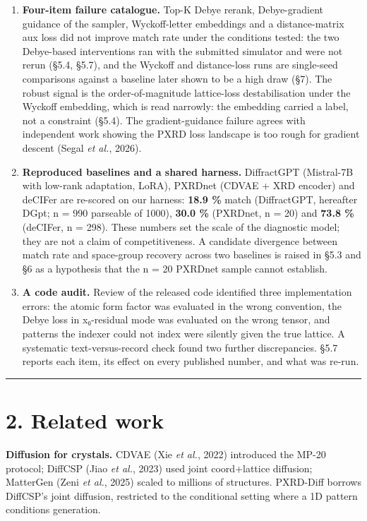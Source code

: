 \documentclass[
  11pt,
]{article}
\begin{document}
\begin{enumerate}
  downstream (§3.5).
\item
  \textbf{Four-item failure catalogue.} Top-K Debye rerank,
  Debye-gradient guidance of the sampler, Wyckoff-letter embeddings and
  a distance-matrix aux loss did not improve match rate under the
  conditions tested: the two Debye-based interventions ran with the
  submitted simulator and were not rerun (§5.4, §5.7), and the Wyckoff
  and distance-loss runs are single-seed comparisons against a baseline
  later shown to be a high draw (§7). The robust signal is the
  order-of-magnitude lattice-loss destabilisation under the Wyckoff
  embedding, which is read narrowly: the embedding carried a label, not
  a constraint (§5.4). The gradient-guidance failure agrees with
  independent work showing the PXRD loss landscape is too rough for
  gradient descent (Segal \emph{et al.}, 2026).
\item
  \textbf{Reproduced baselines and a shared harness.} DiffractGPT
  (Mistral-7B with low-rank adaptation, LoRA), PXRDnet (CDVAE + XRD
  encoder) and deCIFer are re-scored on our harness: \textbf{18.9 \%}
  match (DiffractGPT, hereafter DGpt; n = 990 parseable of 1000),
  \textbf{30.0 \%} (PXRDnet, n = 20) and \textbf{73.8 \%} (deCIFer, n =
  298). These numbers set the scale of the diagnostic model; they are
  not a claim of competitiveness. A candidate divergence between match
  rate and space-group recovery across two baselines is raised in §5.3
  and §6 as a hypothesis that the n = 20 PXRDnet sample cannot
  establish.
\item
  \textbf{A code audit.} Review of the released code identified three
  implementation errors: the atomic form factor was evaluated in the
  wrong convention, the Debye loss in x₀-residual mode was evaluated on
  the wrong tensor, and patterns the indexer could not index were
  silently given the true lattice. A systematic text-versus-record check
  found two further discrepancies. §5.7 reports each item, its effect on
  every published number, and what was re-run.
\end{enumerate}

\begin{center}\rule{0.5\linewidth}{0.5pt}\end{center}

\section{2. Related work}\label{related-work}

\textbf{Diffusion for crystals.} CDVAE (Xie \emph{et al.}, 2022)
introduced the MP-20 protocol; DiffCSP (Jiao \emph{et al.}, 2023) used
joint coord+lattice diffusion; MatterGen (Zeni \emph{et al.}, 2025)
scaled to millions of structures. PXRD-Diff borrows DiffCSP's joint
diffusion, restricted to the conditional setting where a 1D pattern
conditions generation.
\end{document}
